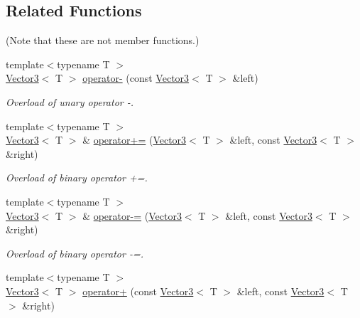 \subsection*{Related Functions}
(Note that these are not member functions.) \begin{DoxyCompactItemize}
\item 
{\footnotesize template$<$typename T $>$ }\\\hyperlink{class_triton_1_1_util_1_1_vector3}{Vector3}$<$ T $>$ \hyperlink{class_triton_1_1_util_1_1_vector3_a9b75d2fb9b0f2fd9fe33f8f06f9dda75}{operator-\/} (const \hyperlink{class_triton_1_1_util_1_1_vector3}{Vector3}$<$ T $>$ \&left)
\begin{DoxyCompactList}\small\item\em Overload of unary operator -\/. \end{DoxyCompactList}\item 
{\footnotesize template$<$typename T $>$ }\\\hyperlink{class_triton_1_1_util_1_1_vector3}{Vector3}$<$ T $>$ \& \hyperlink{class_triton_1_1_util_1_1_vector3_abc28859af163c63318ea2723b81c5ad9}{operator+=} (\hyperlink{class_triton_1_1_util_1_1_vector3}{Vector3}$<$ T $>$ \&left, const \hyperlink{class_triton_1_1_util_1_1_vector3}{Vector3}$<$ T $>$ \&right)
\begin{DoxyCompactList}\small\item\em Overload of binary operator +=. \end{DoxyCompactList}\item 
{\footnotesize template$<$typename T $>$ }\\\hyperlink{class_triton_1_1_util_1_1_vector3}{Vector3}$<$ T $>$ \& \hyperlink{class_triton_1_1_util_1_1_vector3_aa465672d2a4ee5fd354e585cf08d2ab9}{operator-\/=} (\hyperlink{class_triton_1_1_util_1_1_vector3}{Vector3}$<$ T $>$ \&left, const \hyperlink{class_triton_1_1_util_1_1_vector3}{Vector3}$<$ T $>$ \&right)
\begin{DoxyCompactList}\small\item\em Overload of binary operator -\/=. \end{DoxyCompactList}\item 
{\footnotesize template$<$typename T $>$ }\\\hyperlink{class_triton_1_1_util_1_1_vector3}{Vector3}$<$ T $>$ \hyperlink{class_triton_1_1_util_1_1_vector3_a6500a0cb00e07801e9e9d7e96852ddd3}{operator+} (const \hyperlink{class_triton_1_1_util_1_1_vector3}{Vector3}$<$ T $>$ \&left, const \hyperlink{class_triton_1_1_util_1_1_vector3}{Vector3}$<$ T $>$ \&right)

\end{DoxyCompactItemize}
